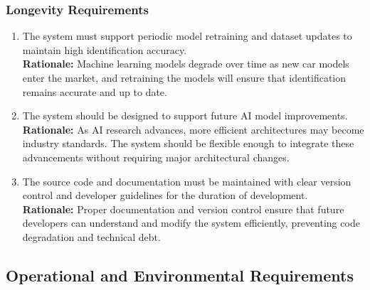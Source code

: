 \documentclass[]{article}
\begin{document}
\subsubsection{Longevity Requirements}
\label{ssub:longevity_requirements}
\begin{enumerate}[label={PR-L\arabic*.}]
    \item The system must support periodic model retraining and dataset updates to maintain high identification accuracy.\\
	\textbf{Rationale:} Machine learning models degrade over time as new car models enter the market, and retraining the models will ensure that identification remains accurate and up to date.
	\item The system should be designed to support future AI model improvements.\\
	\textbf{Rationale:} As AI research advances, more efficient architectures may become industry standards. The system should be flexible enough to integrate these advancements without requiring major architectural changes.
	\item The source code and documentation must be maintained with clear version control and developer guidelines for the duration of development.\\
	\textbf{Rationale:} Proper documentation and version control ensure that future developers can understand and modify the system efficiently, preventing code degradation and technical debt.

\end{enumerate}


\subsection{Operational and Environmental Requirements}
\label{sub:operational_and_environmental_requirements}
\end{document}
